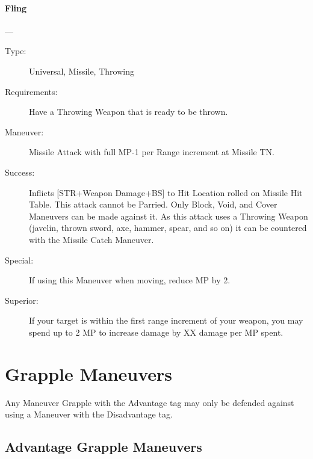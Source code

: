 \documentclass[oneside,11pt,english]{book}
\begin{document}
\paragraph{\large\label{man:Fling}Fling}---\quad{\large[???????]}
\vspace{-10pt}\begin{description} 
\item [Type:] Universal, Missile, Throwing 
\item [Requirements:] Have a Throwing Weapon that is ready to be thrown. 
\item [Maneuver:] Missile Attack with full MP-1 per Range increment at Missile TN. 
\item [Success:] Inflicts [STR+Weapon Damage+BS] to Hit Location rolled on Missile Hit Table. 
This attack cannot be Parried. Only Block, Void, and Cover Maneuvers can be made against it. 
As this attack uses a Throwing Weapon (javelin, thrown sword, axe, hammer, spear, and so on) it can be 
countered with the Missile Catch Maneuver. 
\item [Special:] If using this Maneuver when moving, reduce MP by 2. 
\item [Superior:] If your target is within the first range increment of your weapon, you may spend up to 2 MP to 
increase damage by XX damage per MP spent. 
\end{description}
\section{Grapple Maneuvers}\label{sec:Grappling}
Any Maneuver Grapple with the Advantage tag may only be defended against using a Maneuver with the Disadvantage tag.

\subsection{Advantage Grapple Maneuvers}
\end{document}
